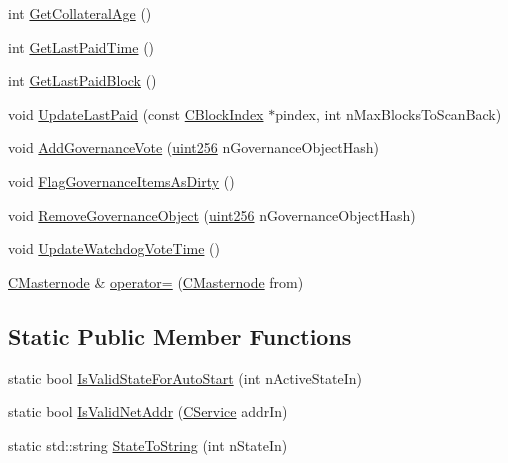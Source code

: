 \begin{DoxyCompactItemize}
\item 
int \mbox{\hyperlink{class_c_masternode_a39de7f9e7c2485dd341f7b7bcaa5def6}{Get\+Collateral\+Age}} ()
\item 
int \mbox{\hyperlink{class_c_masternode_a422620894cf5f9acfac5f44db526cc0d}{Get\+Last\+Paid\+Time}} ()
\item 
int \mbox{\hyperlink{class_c_masternode_ad848b2f168fca83dbc50c4fb07d12868}{Get\+Last\+Paid\+Block}} ()
\item 
void \mbox{\hyperlink{class_c_masternode_ade5a3726f6da526f616045f58a7b5857}{Update\+Last\+Paid}} (const \mbox{\hyperlink{class_c_block_index}{C\+Block\+Index}} $\ast$pindex, int n\+Max\+Blocks\+To\+Scan\+Back)
\item 
void \mbox{\hyperlink{class_c_masternode_a24919d0a7c97271ac4fd4e8f8ae0a42c}{Add\+Governance\+Vote}} (\mbox{\hyperlink{classuint256}{uint256}} n\+Governance\+Object\+Hash)
\item 
void \mbox{\hyperlink{class_c_masternode_a947af1fa2df5f8179a69de8d12511894}{Flag\+Governance\+Items\+As\+Dirty}} ()
\item 
void \mbox{\hyperlink{class_c_masternode_ab8751705e6fa01ebb18dae7162d70b63}{Remove\+Governance\+Object}} (\mbox{\hyperlink{classuint256}{uint256}} n\+Governance\+Object\+Hash)
\item 
void \mbox{\hyperlink{class_c_masternode_a8ef654deadd035f7e4cf786bd38369bb}{Update\+Watchdog\+Vote\+Time}} ()
\item 
\mbox{\hyperlink{class_c_masternode}{C\+Masternode}} \& \mbox{\hyperlink{class_c_masternode_a914fcf71ebc13a0680bb61e173b206f4}{operator=}} (\mbox{\hyperlink{class_c_masternode}{C\+Masternode}} from)
\end{DoxyCompactItemize}
\subsection*{Static Public Member Functions}
\begin{DoxyCompactItemize}
\item 
static bool \mbox{\hyperlink{class_c_masternode_ae509fc0a2f845695fd9f894433c9534f}{Is\+Valid\+State\+For\+Auto\+Start}} (int n\+Active\+State\+In)
\item 
static bool \mbox{\hyperlink{class_c_masternode_a8e2f73e4c9d366b688c088e861534cfd}{Is\+Valid\+Net\+Addr}} (\mbox{\hyperlink{class_c_service}{C\+Service}} addr\+In)
\item 
static std\+::string \mbox{\hyperlink{class_c_masternode_a379321e692aaabfce4ebffc1e54e0d39}{State\+To\+String}} (int n\+State\+In)
\end{DoxyCompactItemize}
